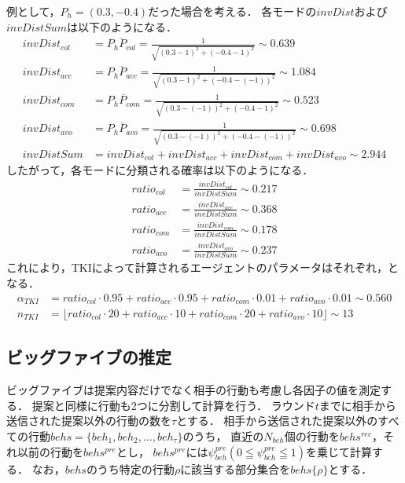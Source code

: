 例として，$P_h = (0.3, -0.4)$だった場合を考える．
各モードの$invDist$および$invDistSum$は以下のようになる．
\begin{align}
    invDist_{col} &= \overline{P_h P_{col}} = \frac{1}{\sqrt{(0.3 - 1)^2 + (-0.4 - 1)^2}} \sim 0.639 \nonumber\\
    invDist_{acc} &= \overline{P_h P_{acc}} = \frac{1}{\sqrt{(0.3 - 1)^2 + (-0.4 - (-1))^2}} \sim 1.084 \nonumber\\
    invDist_{com} &= \overline{P_h P_{com}} = \frac{1}{\sqrt{(0.3 - (-1))^2 + (-0.4 - 1)^2}} \sim 0.523 \nonumber\\
    invDist_{avo} &= \overline{P_h P_{avo}} = \frac{1}{\sqrt{(0.3 - (-1))^2 + (-0.4 - (-1))^2}} \sim 0.698 \nonumber\\
    invDistSum &= invDist_{col} + invDist_{acc} + invDist_{com} + invDist_{avo} \sim 2.944 \nonumber
\end{align}
したがって，各モードに分類される確率は以下のようになる．
\begin{align}
    ratio_{col} &= \frac{invDist_{col}}{invDistSum} \sim 0.217 \nonumber\\
    ratio_{acc} &= \frac{invDist_{acc}}{invDistSum} \sim 0.368 \nonumber\\
    ratio_{com} &= \frac{invDist_{com}}{invDistSum} \sim 0.178 \nonumber\\
    ratio_{avo} &= \frac{invDist_{avo}}{invDistSum} \sim 0.237 \nonumber
\end{align}
これにより，TKIによって計算されるエージェントのパラメータはそれぞれ，となる．
\begin{align}
    \alpha_{TKI} &= ratio_{col} \cdot 0.95 + ratio_{acc} \cdot 0.95 + ratio_{com} \cdot 0.01 + ratio_{avo} \cdot 0.01 \sim 0.560 \label{eq:tki-alpha} \\
    n_{TKI} &= \lfloor ratio_{col} \cdot 20 + ratio_{acc} \cdot 10 + ratio_{com} \cdot 20 + ratio_{avo} \cdot 10 \rfloor \sim 13 \label{eq:tki-n}
\end{align}

\subsection{ビッグファイブの推定}
ビッグファイブは提案内容だけでなく相手の行動も考慮し各因子の値を測定する．
提案と同様に行動も2つに分割して計算を行う．
ラウンド$t$までに相手から送信された提案以外の行動の数を$\tau$とする．
相手から送信された提案以外のすべての行動$behs = \{ beh_1, beh_2, \ldots , beh_\tau \}$のうち，
直近の$N_{beh}$個の行動を$behs^{rec}$，それ以前の行動を$behs^{pre}$とし，
$behs^{pre}$には$\psi_{beh}^{pre}(0 \leqq \psi_{beh}^{pre} \leqq 1)$を乗じて計算する．
なお，$behs$のうち特定の行動$\rho$に該当する部分集合を$behs\{\rho\}$とする．

